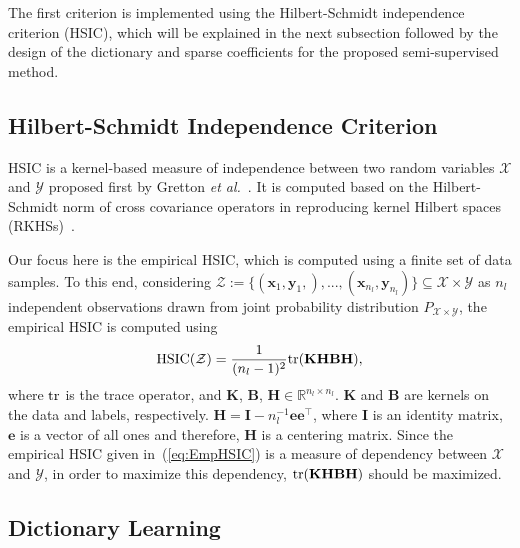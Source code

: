 \documentclass{llncs}
\begin{document}
The first criterion is implemented using the Hilbert-Schmidt independence criterion (HSIC), which will be explained in the next subsection followed by the design of the dictionary and sparse coefficients for the proposed semi-supervised method.

\subsection{Hilbert-Schmidt Independence Criterion}
\label{ssec:HSIC}

HSIC is a kernel-based measure of independence between two random variables $\mathcal{X}$ and $\mathcal{Y}$ proposed first by Gretton \emph{et al.}~\cite{HSIC:Gretton05a,HSIC:Gretton05b}. It is computed based on the Hilbert-Schmidt norm of cross covariance operators in reproducing kernel Hilbert spaces (RKHSs)~\cite{HSIC:Gretton05b}.

Our focus here is the empirical HSIC, which is computed using a finite set of data samples. To this end, considering $\mathcal{Z}:=\{(\mathbf{x}_1,\mathbf{y}_1,),...,(\mathbf{x}_{n_l},\mathbf{y}_{n_l})\}\subseteq\mathcal{X}\times\mathcal{Y}$ as $n_l$ independent observations drawn from joint probability distribution $P_{\mathcal{X}\times \mathcal{Y}}$, the empirical HSIC is computed using
\begin{equation}\label{eq:EmpHSIC}
\textup{HSIC}(\mathcal{Z})=\frac{1}{(n_l-1)^2}\textup{tr}(\mathbf{KHBH}),
\end{equation}
where $\textup{tr}$ is the trace operator, and $\mathbf{K}$, $\mathbf{B}$, $\mathbf{H}\in\mathbb{R}^{n_l\times n_l}$. $\mathbf{K}$ and $\mathbf{B}$ are kernels on the data and labels, respectively. $\mathbf{H}=\mathbf{I}-n_l^{-1}\mathbf{ee}^{\top}$, where $\mathbf{I}$ is an identity matrix, $\mathbf{e}$ is a vector of all ones and therefore, $\mathbf{H}$ is a centering matrix. Since the empirical HSIC given in~(\ref{eq:EmpHSIC}) is a measure of dependency between $\mathcal{X}$ and $\mathcal{Y}$, in order to maximize this dependency, $\textup{tr}(\mathbf{KHBH})$ should be maximized.

\subsection{Dictionary Learning}
\label{ssec:DictionaryLearning}
\end{document}
